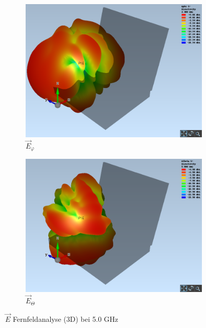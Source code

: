\begin{figure}[h!]
	\begin{subfigure}[b]{0.48\textwidth}
		\includegraphics[width=1\textwidth]{../fig/plt/crazy_stuff_l4_pcb_v2c_laptop_1a_105_5ghz_3d_farfield_ephi_xyz.png}
		\caption{$\vec{E}_{\varphi}$}
	\end{subfigure}
	\begin{subfigure}[b]{0.48\textwidth}
		\includegraphics[width=1\textwidth]{../fig/plt/crazy_stuff_l4_pcb_v2c_laptop_1a_105_5ghz_3d_farfield_etheta_xyz.png}
		\caption{$\vec{E}_{\Theta}$}
	\end{subfigure}
	\caption{$\vec{E}$ Fernfeldanalyse (3D) bei 5.0 GHz}
\end{figure}



